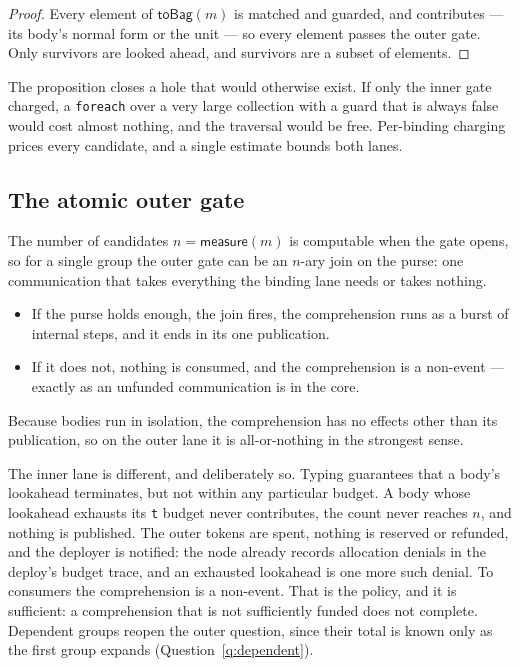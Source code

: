 \documentclass[11pt]{article}
\theoremstyle{definition}
\theoremstyle{plain}
\theoremstyle{remark}
\newcommand{\meas}{\mathsf{measure}}
\newcommand{\fe}{\texttt{foreach}}
\begin{document}
\begin{proof}
Every element of \(\mathsf{toBag}(m)\) is matched and guarded, and contributes
--- its body's normal form or the unit --- so every element passes the outer
gate. Only survivors are looked ahead, and survivors are a subset of elements.
\end{proof}

The proposition closes a hole that would otherwise exist. If only the inner
gate charged, a \fe{} over a very large collection with a guard that is always
false would cost almost nothing, and the traversal would be free. Per-binding
charging prices every candidate, and a single estimate bounds both lanes.

\subsection{The atomic outer gate}
\label{sec:atomicgate}

The number of candidates \(n = \meas(m)\) is computable when the gate opens, so
for a single group the outer gate can be an \(n\)-ary join on the purse: one
communication that takes everything the binding lane needs or takes nothing.
\begin{itemize}[nosep]
\item If the purse holds enough, the join fires, the comprehension runs as a
burst of internal steps, and it ends in its one publication.
\item If it does not, nothing is consumed, and the comprehension is a non-event
--- exactly as an unfunded communication is in the core.
\end{itemize}
Because bodies run in isolation, the comprehension has no effects other than
its publication, so on the outer lane it is all-or-nothing in the strongest
sense.

The inner lane is different, and deliberately so. Typing guarantees that a
body's lookahead terminates, but not within any particular budget. A body whose
lookahead exhausts its \texttt{t} budget never contributes, the count never
reaches \(n\), and nothing is published. The outer tokens are spent, nothing is
reserved or refunded, and the deployer is notified: the node already records
allocation denials in the deploy's budget trace, and an exhausted lookahead is
one more such denial. To consumers the comprehension is a non-event. That is
the policy, and it is sufficient: a comprehension that is not sufficiently
funded does not complete. Dependent groups reopen the outer question, since
their total is known only as the first group expands
(Question~\ref{q:dependent}).
\end{document}

